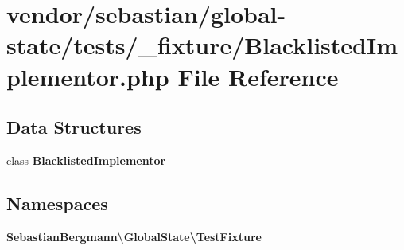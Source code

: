 \section{vendor/sebastian/global-\/state/tests/\+\_\+fixture/\+Blacklisted\+Implementor.php File Reference}
\label{_blacklisted_implementor_8php}
\subsection*{Data Structures}
\begin{DoxyCompactItemize}
\item 
class {\bf Blacklisted\+Implementor}
\end{DoxyCompactItemize}
\subsection*{Namespaces}
\begin{DoxyCompactItemize}
\item 
 {\bf Sebastian\+Bergmann\textbackslash{}\+Global\+State\textbackslash{}\+Test\+Fixture}
\end{DoxyCompactItemize}

